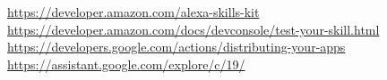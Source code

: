\begin{thebibliography}{99}
     \url{https://developer.amazon.com/alexa-skills-kit}
     \url{https://developer.amazon.com/docs/devconsole/test-your-skill.html}
     \url{https://developers.google.com/actions/distributing-your-apps}
     \url{https://assistant.google.com/explore/c/19/}
\end{thebibliography}
